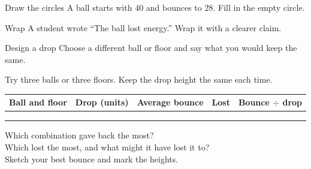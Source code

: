 \begin{puzzle}{Draw the circles}
A ball starts with 40 and bounces to 28. Fill in the empty circle.
\begin{center}
\end{center}
\end{puzzle}

\begin{puzzle}{Wrap}
A student wrote ``The ball lost energy.'' Wrap it with a clearer claim. \wline[6cm]
\end{puzzle}

\begin{puzzle}{Design a drop}
Choose a different ball or floor and say what you would keep the same. \wline[6cm]
\end{puzzle}
\clearpage

\thispagestyle{fancy}
Try three balls or three floors. Keep the drop height the same each time.\par\medskip
\renewcommand{\arraystretch}{3.0}
\begin{tabularx}{\linewidth}{|>{\sffamily\small\bfseries}p{2.6cm}|X|X|X|X|}
\hline
Ball and floor & Drop (units) & Average bounce & Lost & Bounce $\div$ drop \\ \hline
 & & & & \\ \hline
 & & & & \\ \hline
 & & & & \\ \hline
\end{tabularx}

\vspace{8pt}
Which combination gave back the most? \wline[7cm]\\[10pt]
Which lost the most, and what might it have lost it to? \wline[5cm]\\[10pt]
Sketch your best bounce and mark the heights.\par\medskip
{}
\clearpage
